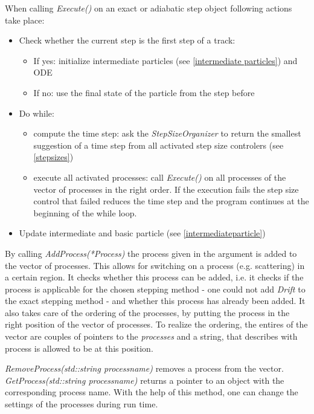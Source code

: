     When calling \textit{Execute()} on an exact or adiabatic step object following actions take place:
      \begin{itemize}
        \item Check whether the current step is the first step of a track:
        \begin{itemize}
            \item If yes: initialize intermediate particles (see \ref{intermediate particles}) and ODE
            \item If no: use the final state of the particle from the step before
        \end{itemize}
        \item Do while:
        \begin{itemize}
            \item compute the time step: ask the \textit{StepSizeOrganizer} to return the smallest suggestion of a time step from all activated step size controlers (see \ref{stepsizes}) 
            \item execute all activated processes: call \textit{Execute()} on all processes of the vector of processes in the right order. If the execution fails the step size control that failed reduces the time step and the program continues at the beginning of the while loop.
        \end{itemize} 
        \item Update intermediate and basic particle (see \ref{intermediateparticle})
      \end{itemize} 
        
    By calling \textit{AddProcess(*Process)} the process given in the argument is added to the vector of processes. This allows for switching on a process (e.g. scattering) in a certain region. It checks whether this process can be added, i.e. it checks if the process is applicable for the chosen stepping method - one could not add \textit{Drift} to the exact stepping method - and whether this process has already been added. It also takes care of the ordering of the processes, by putting the process in the right position of the vector of processes. To realize the ordering, the entires of the vector are couples of pointers to the \textit{processes} and a string, that describes with process is allowed to be at this position. 
    
    \textit{RemoveProcess(std::string processname)} removes a process from the vector. \textit{GetProcess(std::string processname)} returns a pointer to an object with the corresponding process name. With the help of this method, one can change the settings of the processes during run time.
    
